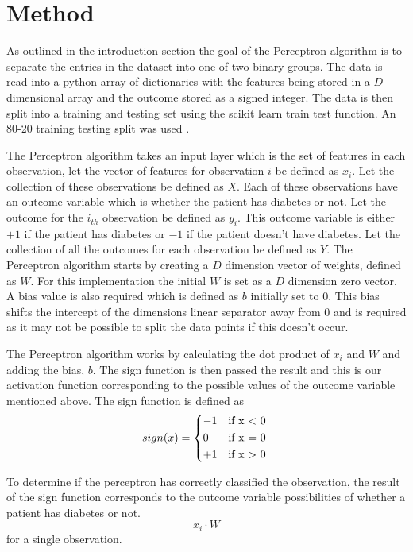 \documentclass[10pt,twocolumn,letterpaper]{article}
\begin{document}
\section{Method}

As outlined in the introduction section the goal of the Perceptron algorithm is to separate
the entries in the dataset into one of two binary groups. The data is read into a python array
of dictionaries with the features being stored in a $D$ dimensional array and the outcome
stored as a signed integer. The data is then split into a training and testing set using the
scikit learn train test function. An 80-20 training testing split was used \cite{gholamy_why_nodate}.

The Perceptron algorithm takes an input layer which is the set of features in each observation, let
the vector of features for observation $i$ be defined as $x_i$. Let the collection of these observations
be defined as $X$. Each of these observations have an outcome variable which is whether the patient has
diabetes or not. Let the outcome for the $i_{th}$ observation be defined as $y_i$. This outcome variable
is either $+1$ if the patient has diabetes or $-1$ if the patient doesn't have diabetes. Let the collection
of all the outcomes for each observation be defined as $Y$. The Perceptron algorithm starts by creating a $D$
dimension vector of weights, defined as $W$. For this implementation the initial $W$ is set as a $D$ dimension
zero vector. A bias value is also required which is defined as $b$ initially set to $0$. This bias shifts the
intercept of the dimensions linear separator away from $0$ and is required as it may not be possible to
split the data points if this doesn't occur.

The Perceptron algorithm works by calculating the dot product of $x_i$ and $W$ and adding the bias, $b$.
The sign function is then passed the result and this is our activation function corresponding to the possible
values of the outcome variable mentioned above. The sign function is defined as
\[
   sign(x)= \begin{cases*}
      -1 & if x $<$ 0 \\
      0  & if x = 0   \\
      +1 & if x $>$ 0 \\
   \end{cases*}
\]

To determine if the perceptron has correctly classified the observation, the result of the sign function
corresponds to the outcome variable possibilities of whether a patient has diabetes or not.
\begin{equation}
   x_i \cdot W
\end{equation}
for a single observation.




   {\small
      
      
   }
\end{document}
